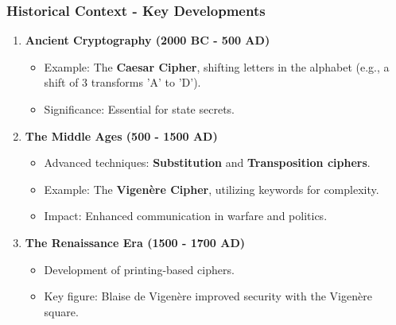 \documentclass{beamer}
\begin{document}
\begin{frame}[fragile]
    \frametitle{Historical Context - Key Developments}
    \begin{enumerate}
        \item \textbf{Ancient Cryptography (2000 BC - 500 AD)}
            \begin{itemize}
                \item Example: The \textbf{Caesar Cipher}, shifting letters in the alphabet (e.g., a shift of 3 transforms 'A' to 'D').
                \item Significance: Essential for state secrets.
            \end{itemize}

        \item \textbf{The Middle Ages (500 - 1500 AD)}
            \begin{itemize}
                \item Advanced techniques: \textbf{Substitution} and \textbf{Transposition ciphers}.
                \item Example: The \textbf{Vigenère Cipher}, utilizing keywords for complexity.
                \item Impact: Enhanced communication in warfare and politics.
            \end{itemize}

        \item \textbf{The Renaissance Era (1500 - 1700 AD)}
            \begin{itemize}
                \item Development of printing-based ciphers.
                \item Key figure: Blaise de Vigenère improved security with the Vigenère square.
            \end{itemize}
    \end{enumerate}
\end{frame}
\end{document}
